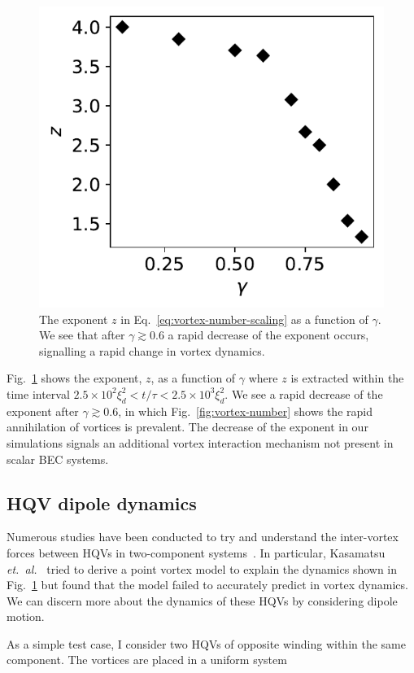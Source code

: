 \begin{figure}[t!]
    \centering
    \includegraphics{gfx/ch-twoCompDynamics/gamma_vs_expo.pdf}
    \caption{The exponent \( z \) in Eq.~\eqref{eq:vortex-number-scaling} as a
    function of \(\gamma \).
    We see that after \(\gamma \gtrsim 0.6\) a rapid decrease of the exponent
    occurs, signalling a rapid change in vortex
    dynamics.\label{fig:exponent-vs-gamma}}
\end{figure}
Fig.~\ref{fig:exponent-vs-gamma} shows the exponent, \( z \), as a function of
\(\gamma \) where \( z \) is extracted within the time interval
\(2.5 \times 10^2\xi_d^2 < t/\tau < 2.5\times10^3\xi_d^2\).
We see a rapid decrease of the exponent after \(\gamma \gtrsim 0.6\), in which
Fig.~\ref{fig:vortex-number} shows the rapid annihilation of vortices is
prevalent.
The decrease of the exponent in our simulations signals an additional vortex
interaction mechanism not present in scalar BEC systems.

\subsection{HQV dipole dynamics}
Numerous studies have been conducted to try and understand the inter-vortex
forces between HQVs in two-component systems~\cite{Eto2011, Kasamatsu2016}.
In particular, Kasamatsu \textit{et.\ al.}~\cite{Kasamatsu2016} tried to derive a
point vortex model to explain the dynamics shown in
Fig.~\ref{fig:exponent-vs-gamma} but found that the model failed to accurately
predict in vortex dynamics.
We can discern more about the dynamics of these HQVs by considering dipole
motion.


As a simple test case, I consider two HQVs of opposite winding within the same
component.
The vortices are placed in a uniform system
